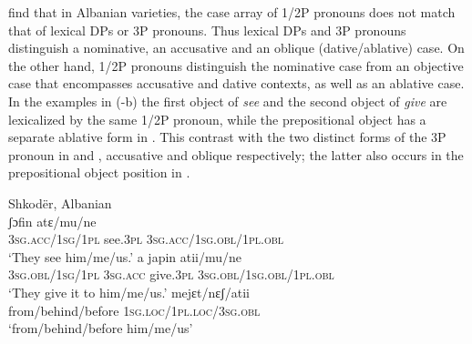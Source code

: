 \documentclass[output=paper,colorlinks,citecolor=brown,nonflat]{./langscibook}
\begin{document}
\citet{ManziniSavoia2014} find that in Albanian varieties, the case array of 1/2P pronouns does not match that of lexical DPs or 3P pronouns. Thus lexical DPs and 3P pronouns distinguish a nominative, an accusative and an oblique (dative/ablative) case. On the other hand, 1/2P pronouns distinguish the nominative case from an objective case that encompasses accusative and dative contexts, as well as an ablative case. In the examples in (-b) the first object of \textit{see} and the second object of \textit{give} are lexicalized by the same 1/2P pronoun, while the prepositional object has a separate ablative form in . This contrast with the two distinct forms of the 3P pronoun in  and , accusative and oblique respectively; the latter also occurs in the prepositional object position in .  

\ea%
    \label{ex:manzini:10}
    Shkodër, Albanian \citep{ManziniSavoia2014}\\
    \ea\label{ex:manzini:10a} 
          {ʃɔfin}    {atɛ/mu/ne}\\
        \textsc{3sg.acc/1sg/1pl}    see.\textsc{3pl} \textsc{3sg.acc/1sg.obl/1pl.obl}\\
    \glt ‘They see him/me/us.’
    \ex\label{ex:manzini:10b} 
           {a}   {japin}    {atii/mu/ne}\\
        \textsc{3sg.obl/1sg/1pl} \textsc{3sg.acc} give.\textsc{3pl}  \textsc{3sg.obl/1sg.obl/1pl.obl}\\
    \glt ‘They give it to him/me/us.’
    \ex\label{ex:manzini:10c} 
         {mejɛt/nɛʃ/atii}\\
        from/behind/before \textsc{1sg.loc/1pl.loc/3sg.obl}\\
    \glt ‘from/behind/before him/me/us’
    \z
\z
\end{document}
